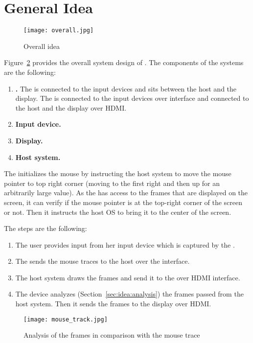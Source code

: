 \section{General Idea}
\label{sec:idea}

\begin{figure}
\centering
\texttt{[image: overall.jpg]}
\caption{Overall idea}
\label{fig:overallIdea}
\centering
\end{figure}


Figure~\ref{fig:overallIdea} provides the overall system design of \name. The components of the systems are the following:

\begin{enumerate}
  \item \textbf{\device.} The \device is connected to the input devices and sits between the host and the display. The \device is connected to the input devices over \usb interface and connected to the host and the display over HDMI.
  \item \textbf{Input device.}
  \item \textbf{Display.}
  \item \textbf{Host system.}
\end{enumerate}

 The \device initializes the mouse by instructing the host system to move the mouse pointer to top right corner (moving to the first right and then up for an arbitrarily large value). As the \device has access to the frames that are displayed on the screen, it can verify if the mouse pointer is at the top-right corner of the screen or not. Then it instructs the host OS to bring it to the center of the screen.

The steps are the following:

\begin{enumerate}
  \item The user provides input from her input device which is captured by the \device.
  \item The \device sends the mouse traces to the host over the \bluetooth interface.
  \item The host system draws the frames and send it to the \device over HDMI interface.
  \item The device analyzes (Section~\ref{sec:idea:analysis}) the frames passed from the host system. Then it sends the frames to the display over HDMI.
\end{enumerate}


\begin{figure}
\centering
\texttt{[image: mouse\_track.jpg]}
\caption{Analysis of the frames in comparison with the mouse trace}
\label{fig:overallIdea}
\centering
\end{figure}


